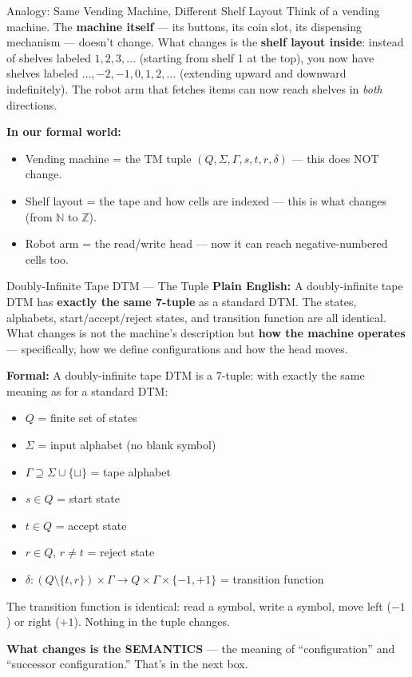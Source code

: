 \begin{notebox}{{Analogy: Same Vending Machine, Different Shelf Layout}}
Think of a vending machine. The \textbf{machine itself} --- its buttons, its
coin slot, its dispensing mechanism --- doesn't change. What changes is the
\textbf{shelf layout inside}: instead of shelves labeled $1, 2, 3, \ldots$
(starting from shelf 1 at the top), you now have shelves labeled
$\ldots, -2, -1, 0, 1, 2, \ldots$ (extending upward and downward
indefinitely). The robot arm that fetches items can now reach shelves in
\emph{both} directions.

\textbf{In our formal world:}
\begin{itemize}[nosep]
\item Vending machine = the TM tuple $(Q, \Sigma, \Gamma, s, t, r, \delta)$
  --- this does NOT change.
\item Shelf layout = the tape and how cells are indexed --- this is what
  changes (from $\mathbb{N}$ to $\mathbb{Z}$).
\item Robot arm = the read/write head --- now it can reach negative-numbered
  cells too.
\end{itemize}
\end{notebox}

\begin{definitionbox}{{Doubly-Infinite Tape DTM --- The Tuple}}
\textbf{Plain English:}
A doubly-infinite tape DTM has \textbf{exactly the same 7-tuple} as a standard
DTM. The states, alphabets, start/accept/reject states, and transition
function are all identical. What changes is not the machine's description but
\textbf{how the machine operates} --- specifically, how we define
configurations and how the head moves.

\textbf{Formal:}
A doubly-infinite tape DTM is a 7-tuple:
with exactly the same meaning as for a standard DTM:
\begin{itemize}[nosep]
\item $Q$ = finite set of states
\item $\Sigma$ = input alphabet (no blank symbol)
\item $\Gamma \supseteq \Sigma \cup \{\sqcup\}$ = tape alphabet
\item $s \in Q$ = start state
\item $t \in Q$ = accept state
\item $r \in Q$, $r \neq t$ = reject state
\item $\delta \colon (Q \setminus \{t,r\}) \times \Gamma \to Q \times \Gamma \times \{-1,+1\}$ = transition function
\end{itemize}

The transition function is identical: read a symbol, write a symbol, move left
($-1$) or right ($+1$). Nothing in the tuple changes.

\textbf{What changes is the SEMANTICS} --- the meaning of ``configuration''
and ``successor configuration.'' That's in the next box.
\end{definitionbox}

